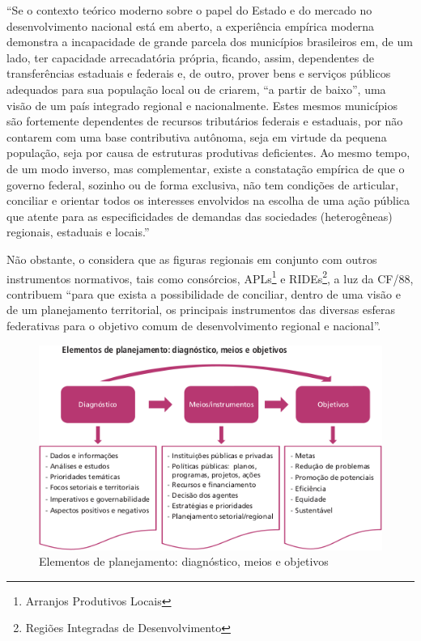 \documentclass[
article,			%
11pt,				%
oneside,			%
a4paper,			%
english,			%
brazil,				%
sumario=tradicional
]{abntex2}
\begin{document}
	\begin{citacao}
		``Se o contexto teórico moderno sobre o papel do Estado e do mercado no desenvolvimento nacional está em aberto, a experiência empírica moderna demonstra a incapacidade de grande parcela dos municípios brasileiros em, de um lado, ter capacidade arrecadatória própria, ficando, assim, dependentes de transferências estaduais e federais e, de outro, prover bens e serviços públicos adequados para sua população local ou de criarem, “a partir de baixo”, uma visão de um país integrado regional e nacionalmente. Estes mesmos municípios são fortemente dependentes de recursos 	tributários federais e estaduais, por não contarem com uma base contributiva autônoma, seja em virtude da pequena população, seja por causa de estruturas produtivas deficientes. Ao mesmo tempo, de um modo inverso, mas complementar, existe a constatação empírica de que o governo federal, sozinho ou de forma exclusiva, não tem condições de articular, conciliar e orientar todos os interesses envolvidos na escolha de uma ação pública que atente para as especificidades de demandas das sociedades (heterogêneas) regionais, estaduais e locais.'' \cite[p. 94]{mendes2012}
	\end{citacao}
	
	Não obstante, o  considera que as figuras regionais em conjunto com outros instrumentos normativos, tais como consórcios, APLs\footnote{Arranjos Produtivos Locais} e RIDEs\footnote{Regiões Integradas de Desenvolvimento}, a luz da CF/88, contribuem ``para que exista a possibilidade de conciliar, dentro de uma visão e de um planejamento territorial, os principais instrumentos das diversas esferas federativas para o objetivo comum de desenvolvimento regional e nacional''.
	
	\begin{figure}[htb]
		\centering
		\caption{Elementos de planejamento: diagnóstico, meios e objetivos}
		\label{fig:mendes2010_pag0098}
		\includegraphics[width=0.7\linewidth]{img/mendes2010_pag0098}
	\end{figure}
\end{document}
